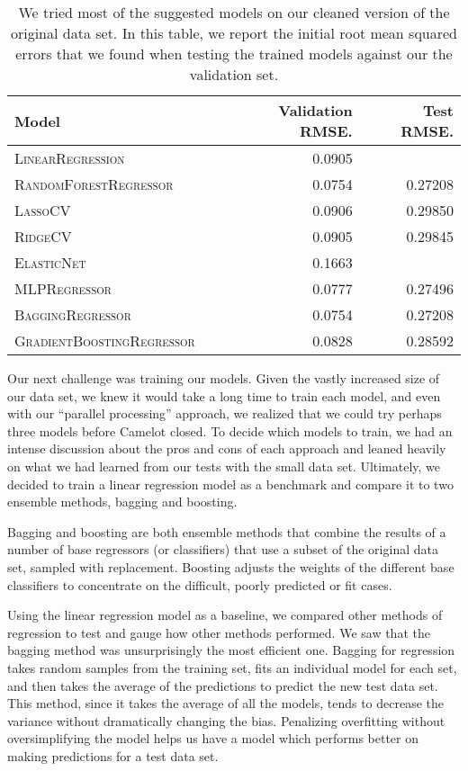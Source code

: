 \documentclass[11pt]{article}
\begin{document}
\begin{table}
\centering
\begin{tabular}{llrr}
 \toprule
 Model &  & Validation RMSE. & Test RMSE.\\
 \midrule
 \textsc{LinearRegression} & & 0.0905 &\\
 \textsc{RandomForestRegressor} & & 0.0754 & 0.27208\\
 \textsc{LassoCV} & & 0.0906  & 0.29850\\
 \textsc{RidgeCV} & &0.0905 & 0.29845\\
 \textsc{ElasticNet} & & 0.1663 & \\
 \textsc{MLPRegressor} & & 0.0777 & 0.27496\\
 \textsc{BaggingRegressor} & & 0.0754 & 0.27208\\
 \textsc{GradientBoostingRegressor} & & 0.0828 & 0.28592\\
 
 \bottomrule
\end{tabular}
\caption{\label{tab:results} We tried most of the suggested models on our cleaned version of the original data set. In this table, we report the initial root mean squared errors that we found when testing the trained models against our the validation set.}
\end{table}

Our next challenge was training our models. Given the vastly increased size of our data set, we knew it would take a long time to train each model, and even with our ``parallel processing'' approach, we realized that we could try perhaps three models before Camelot closed. To decide which models to train, we had an intense discussion about the pros and cons of each approach and leaned heavily on what we had learned from our tests with the small data set. Ultimately, we decided to train a linear regression model as a benchmark and compare it to two ensemble methods, bagging and boosting.

Bagging and boosting are both ensemble methods that combine the results of a number of base regressors (or classifiers) that use a subset of the original data set, sampled with replacement.  Boosting adjusts the weights of the different base classifiers to concentrate on the difficult, poorly predicted or fit cases.  

Using the linear regression model as a baseline, we compared other methods of regression to test and gauge how other methods performed. We saw that the bagging method was unsurprisingly the most efficient one. Bagging for regression takes random samples from the training set, fits an individual model for each set, and then takes the average of the predictions to predict the new test data set. This method, since it takes the average of all the models, tends to decrease the variance without dramatically changing the bias. Penalizing overfitting without oversimplifying the model helps us have a model which performs better on making predictions for a test data set. 
\end{document}
